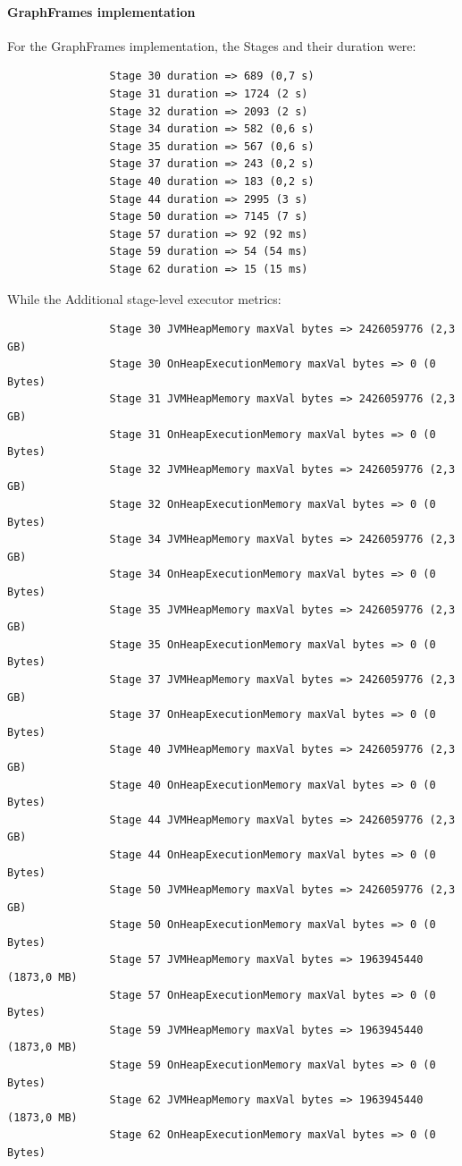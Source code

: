 \documentclass[a4paper,11pt, twoside]{article}
\begin{document}
            \paragraph{GraphFrames implementation}
            For the GraphFrames implementation, the Stages and their duration were:
            \begin{verbatim}
                Stage 30 duration => 689 (0,7 s)
                Stage 31 duration => 1724 (2 s)
                Stage 32 duration => 2093 (2 s)
                Stage 34 duration => 582 (0,6 s)
                Stage 35 duration => 567 (0,6 s)
                Stage 37 duration => 243 (0,2 s)
                Stage 40 duration => 183 (0,2 s)
                Stage 44 duration => 2995 (3 s)
                Stage 50 duration => 7145 (7 s)
                Stage 57 duration => 92 (92 ms)
                Stage 59 duration => 54 (54 ms)
                Stage 62 duration => 15 (15 ms)
            \end{verbatim}
            \bigskip
            While the Additional stage-level executor metrics:
            \begin{verbatim}
                Stage 30 JVMHeapMemory maxVal bytes => 2426059776 (2,3 GB)
                Stage 30 OnHeapExecutionMemory maxVal bytes => 0 (0 Bytes)
                Stage 31 JVMHeapMemory maxVal bytes => 2426059776 (2,3 GB)
                Stage 31 OnHeapExecutionMemory maxVal bytes => 0 (0 Bytes)
                Stage 32 JVMHeapMemory maxVal bytes => 2426059776 (2,3 GB)
                Stage 32 OnHeapExecutionMemory maxVal bytes => 0 (0 Bytes)
                Stage 34 JVMHeapMemory maxVal bytes => 2426059776 (2,3 GB)
                Stage 34 OnHeapExecutionMemory maxVal bytes => 0 (0 Bytes)
                Stage 35 JVMHeapMemory maxVal bytes => 2426059776 (2,3 GB)
                Stage 35 OnHeapExecutionMemory maxVal bytes => 0 (0 Bytes)
                Stage 37 JVMHeapMemory maxVal bytes => 2426059776 (2,3 GB)
                Stage 37 OnHeapExecutionMemory maxVal bytes => 0 (0 Bytes)
                Stage 40 JVMHeapMemory maxVal bytes => 2426059776 (2,3 GB)
                Stage 40 OnHeapExecutionMemory maxVal bytes => 0 (0 Bytes)
                Stage 44 JVMHeapMemory maxVal bytes => 2426059776 (2,3 GB)
                Stage 44 OnHeapExecutionMemory maxVal bytes => 0 (0 Bytes)
                Stage 50 JVMHeapMemory maxVal bytes => 2426059776 (2,3 GB)
                Stage 50 OnHeapExecutionMemory maxVal bytes => 0 (0 Bytes)
                Stage 57 JVMHeapMemory maxVal bytes => 1963945440 (1873,0 MB)
                Stage 57 OnHeapExecutionMemory maxVal bytes => 0 (0 Bytes)
                Stage 59 JVMHeapMemory maxVal bytes => 1963945440 (1873,0 MB)
                Stage 59 OnHeapExecutionMemory maxVal bytes => 0 (0 Bytes)
                Stage 62 JVMHeapMemory maxVal bytes => 1963945440 (1873,0 MB)
                Stage 62 OnHeapExecutionMemory maxVal bytes => 0 (0 Bytes)
            \end{verbatim}
    \clearpage
     
\end{document}
